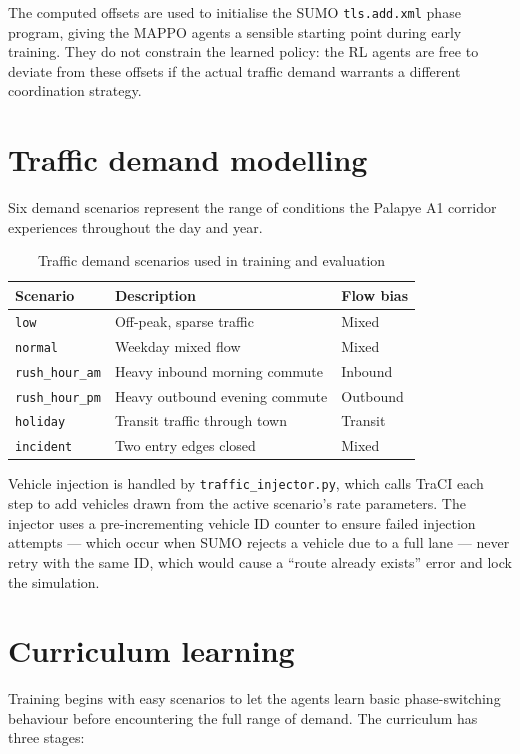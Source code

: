 \documentclass[11pt, a4paper]{report}
\begin{document}
The computed offsets are used to initialise the SUMO \texttt{tls.add.xml} phase program, giving the MAPPO agents a sensible starting point during early training. They do not constrain the learned policy: the RL agents are free to deviate from these offsets if the actual traffic demand warrants a different coordination strategy.

\section{Traffic demand modelling}

Six demand scenarios represent the range of conditions the Palapye A1 corridor experiences throughout the day and year.

\begin{table}[H]
\centering
\caption{Traffic demand scenarios used in training and evaluation}
\label{tab:scenarios}
\begin{tabular}{lll}
\toprule
\textbf{Scenario} & \textbf{Description} & \textbf{Flow bias} \\
\midrule
\texttt{low} & Off-peak, sparse traffic & Mixed \\
\texttt{normal} & Weekday mixed flow & Mixed \\
\texttt{rush\_hour\_am} & Heavy inbound morning commute & Inbound \\
\texttt{rush\_hour\_pm} & Heavy outbound evening commute & Outbound \\
\texttt{holiday} & Transit traffic through town & Transit \\
\texttt{incident} & Two entry edges closed & Mixed \\
\bottomrule
\end{tabular}
\end{table}

Vehicle injection is handled by \texttt{traffic\_injector.py}, which calls TraCI each step to add vehicles drawn from the active scenario's rate parameters. The injector uses a pre-incrementing vehicle ID counter to ensure failed injection attempts --- which occur when SUMO rejects a vehicle due to a full lane --- never retry with the same ID, which would cause a ``route already exists'' error and lock the simulation.

\section{Curriculum learning}

Training begins with easy scenarios to let the agents learn basic phase-switching behaviour before encountering the full range of demand. The curriculum has three stages:
\end{document}
